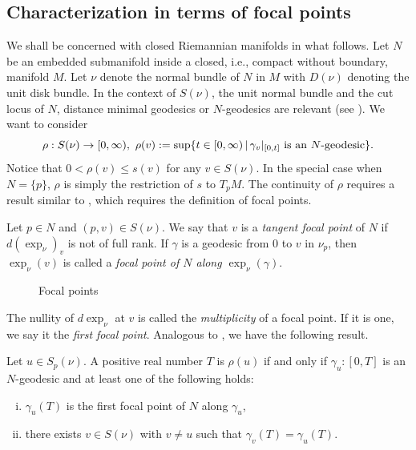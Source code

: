\subsection{Characterization in terms of focal points}
\hfb We shall be concerned with closed Riemannian manifolds in what follows. Let $N$ be an embedded submanifold inside a 
closed, i.e., compact without boundary, manifold $M$. Let $\nu$ denote the normal bundle of $N$ in $M$ with $D(\nu)$ denoting the unit disk bundle. In the context of $S(\nu)$, the unit normal bundle and the cut locus of $N$, distance minimal geodesics or $N$-geodesics are relevant (see ). We want to consider 
\begin{equation}\label{snu}
    \rho:S(\nu)\to [0,\infty),\,\,\rho(v):=\sup\{t\in [0,\infty)\,|\,\gamma_v |_{[0,t]}\,\,\textup{is an $N$-geodesic}\}.
\end{equation}
Notice that $0<\rho(v)\leq s(v)$ for any $v\in S(\nu)$. In the special case when $N=\{p\}$, $\rho$ is simply the restriction of $s$ to $T_p M$. The continuity of $\rho$ requires a result similar to , which requires the definition of focal points.  
\begin{defn}\label{defn:focalPoint}
    Let $p\in N$ and $(p,v)\in S(\nu)$. We say that $v$ is a \emph{tangent focal point} of $N$ if $d (\exp_\nu)_v$ is not of full rank. If $\gamma$ is a geodesic from $0$ to $v$ in $\nu_p$, then $\exp_\nu(v)$ is called a \emph{focal point of $N$ along $\exp_\nu(\gamma)$}.
\end{defn}
\vspace{0.3cm}
\begin{figure}[!htb]
    \centering
    \caption{Focal points\label{fig:FocalPoints}}
\end{figure}

\hf The nullity of $d\exp_\nu$ at $v$ is called the \textit{multiplicity} of a focal point. If it is one, we say it the \textit{first focal point}.  Analogous to , we have the following result.
\begin{thm}\label{thm:CharacterizationOfCutLocusInTermsOfFocalPoint}
    Let $u\in S_p(\nu)$. A positive real number $T$ is $\rho(u)$ if and only if $\gamma_u:[0,T]$ is an $N$-geodesic and at least one of the following holds:
    \begin{enumerate}[(i)]
        \item $\gamma_u(T)$ is the first focal point of $N$ along $\gamma_u$,
        \item there exists $v\in S(\nu)$ with $v\neq u$ such that $\gamma_v(T)=\gamma_u(T)$.
    \end{enumerate}
\end{thm}

